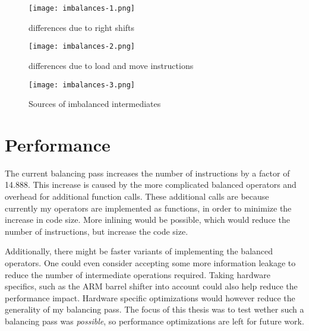 \begin{sidewaysfigure}[h]
  \centering
  \texttt{[image: imbalances-1.png]}
  \caption{\hammingw{} differences due to right shifts}
  \label{fig:imbalances1}
\end{sidewaysfigure}

\begin{sidewaysfigure}[h]
  \centering
  \texttt{[image: imbalances-2.png]}
  \caption{\hammingw{} differences due to load and move instructions}
  \label{fig:imbalances2}
\end{sidewaysfigure}

\begin{sidewaysfigure}[h]
  \centering
  \texttt{[image: imbalances-3.png]}
  \caption{Sources of imbalanced intermediates}
  \label{fig:imbalances3}
\end{sidewaysfigure}

\section{Performance}
The current balancing pass increases the number of instructions by a factor of 14.888.
This increase is caused by the more complicated balanced operators and overhead for additional function calls.
These additional calls are because currently my operators are implemented as functions, in order to minimize the increase in code size.
More inlining would be possible, which would reduce the number of instructions, but increase the code size.

Additionally, there might be faster variants of implementing the balanced operators.
One could even consider accepting some more information leakage to reduce the number of intermediate operations required.
Taking hardware specifics, such as the ARM barrel shifter into account could also help reduce the performance impact.
Hardware specific optimizations would however reduce the generality of my balancing pass.
The focus of this thesis was to test wether such a balancing pass was \emph{possible}, so performance optimizations are left for future work.
